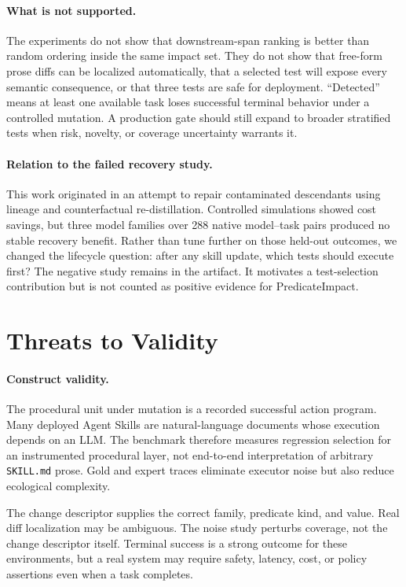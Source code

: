 \documentclass[10pt]{article}
\begin{document}
\paragraph{What is not supported.}
The experiments do not show that downstream-span ranking is better than random ordering inside the same impact set. They do not show that free-form prose diffs can be localized automatically, that a selected test will expose every semantic consequence, or that three tests are safe for deployment. ``Detected'' means at least one available task loses successful terminal behavior under a controlled mutation. A production gate should still expand to broader stratified tests when risk, novelty, or coverage uncertainty warrants it.

\paragraph{Relation to the failed recovery study.}
This work originated in an attempt to repair contaminated descendants using lineage and counterfactual re-distillation. Controlled simulations showed cost savings, but three model families over 288 native model--task pairs produced no stable recovery benefit. Rather than tune further on those held-out outcomes, we changed the lifecycle question: after any skill update, which tests should execute first? The negative study remains in the artifact. It motivates a test-selection contribution but is not counted as positive evidence for PredicateImpact.

\section{Threats to Validity}
\paragraph{Construct validity.}
The procedural unit under mutation is a recorded successful action program. Many deployed Agent Skills are natural-language documents whose execution depends on an LLM. The benchmark therefore measures regression selection for an instrumented procedural layer, not end-to-end interpretation of arbitrary \texttt{SKILL.md} prose. Gold and expert traces eliminate executor noise but also reduce ecological complexity.

The change descriptor supplies the correct family, predicate kind, and value. Real diff localization may be ambiguous. The noise study perturbs coverage, not the change descriptor itself. Terminal success is a strong outcome for these environments, but a real system may require safety, latency, cost, or policy assertions even when a task completes.
\end{document}
